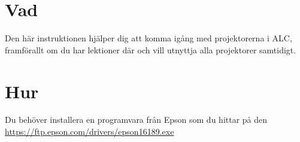 \documentclass[11pt]{article}
\begin{document}
\section{Vad}
    Den här instruktionen hjälper dig att komma igång med projektorerna i ALC, framförallt om du har lektioner där
    och vill utnyttja alla projektorer samtidigt.
\section{Hur}
    Du behöver installera en programvara från Epson som du hittar på den \href{här länken}{https://ftp.epson.com/drivers/epson16189.exe}
\end{document}
